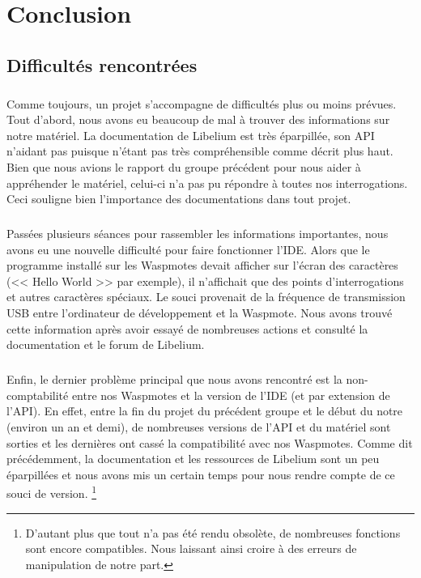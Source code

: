 \chapter*{Conclusion}
\label{sec:conclusion}

\setlength{\parskip}{0.7pt}

\section*{Difficultés rencontrées}
    \paragraph{}Comme toujours, un projet s'accompagne de difficultés plus ou moins prévues. Tout d'abord, nous avons eu beaucoup de mal à trouver des informations sur notre matériel. La documentation de Libelium est très éparpillée, son API n'aidant pas puisque n'étant pas très compréhensible comme décrit plus haut. Bien que nous avions le rapport du groupe précédent pour nous aider à appréhender le matériel, celui-ci n'a pas pu répondre à toutes nos interrogations. Ceci souligne bien l'importance des documentations dans tout projet.
    
    \paragraph{}Passées plusieurs séances pour rassembler les informations importantes, nous avons eu une nouvelle difficulté pour faire fonctionner l'IDE. Alors que le programme installé sur les Waspmotes devait afficher sur l'écran des caractères (<< Hello World >> par exemple), il n'affichait que des points d'interrogations et autres caractères spéciaux. Le souci provenait de la fréquence de transmission USB entre l'ordinateur de développement et la Waspmote. Nous avons trouvé cette information après avoir essayé de nombreuses actions et consulté la documentation et le forum de Libelium.

    \paragraph{}Enfin, le dernier problème principal que nous avons rencontré est la non-comptabilité entre nos Waspmotes et la version de l'IDE (et par extension de l'API). En effet, entre la fin du projet du précédent groupe et le début du notre (environ un an et demi), de nombreuses versions de l'API et du matériel sont sorties et les dernières ont cassé la compatibilité avec nos Waspmotes. Comme dit précédemment, la documentation et les ressources de Libelium sont un peu éparpillées et nous avons mis un certain temps pour nous rendre compte de ce souci de version. \footnote{D'autant plus que tout n'a pas été rendu obsolète, de nombreuses fonctions sont encore compatibles. Nous laissant ainsi croire à des erreurs de manipulation de notre part.}
    
